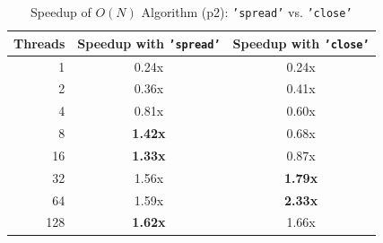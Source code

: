 \documentclass[11pt, letterpaper]{article}
\begin{document}
\begin{table}[h!]
    \centering
    \caption{Speedup of $O(N)$ Algorithm (p2): \texttt{'spread'} vs. \texttt{'close'}}
    \label{tab:speedup_affinity}
    \begin{tabular}{rcc}
        \toprule
        Threads & Speedup with \texttt{'spread'} & Speedup with \texttt{'close'} \\
        \midrule
        1   & 0.24x & 0.24x \\
        2   & 0.36x & 0.41x \\
        4   & 0.81x & 0.60x \\
        8   & \textbf{1.42x} & 0.68x \\
        16  & \textbf{1.33x} & 0.87x \\
        32  & 1.56x & \textbf{1.79x} \\
        64  & 1.59x & \textbf{2.33x} \\
        128 & \textbf{1.62x} & 1.66x \\
        \bottomrule
    \end{tabular}
\end{table}
\end{document}
